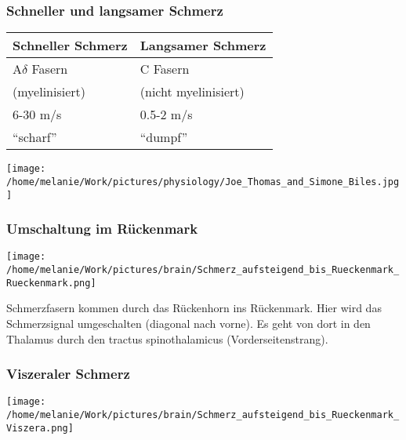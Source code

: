 \documentclass{beamer}
\begin{document}
\begin{frame}
\frametitle{Schneller und langsamer Schmerz}

\begin{center}

\begin{tabular}{|l|l|}
\hline
Schneller Schmerz       & Langsamer Schmerz \\
\hline
A\(\delta\) Fasern     & C Fasern \\
(myelinisiert)          & (nicht myelinisiert) \\
6-30 m/s                & 0.5-2 m/s \\
``scharf''              & ``dumpf'' \\
\hline
\end{tabular}

\end{center}


\pause
\begin{center}
\texttt{[image: /home/melanie/Work/pictures/physiology/Joe\_Thomas\_and\_Simone\_Biles.jpg]}
\end{center}



\end{frame}









\begin{frame}
\frametitle{Umschaltung im Rückenmark}

\begin{center}
\texttt{[image: /home/melanie/Work/pictures/brain/Schmerz\_aufsteigend\_bis\_Rueckenmark\_Rueckenmark.png]}
\end{center}

\pause

Schmerzfasern kommen durch das Rückenhorn ins Rückenmark. Hier wird das Schmerzsignal umgeschalten (diagonal nach vorne). Es geht von dort in den Thalamus durch den tractus spinothalamicus (Vorderseitenstrang). 

\end{frame}


\begin{frame}

\frametitle{Viszeraler Schmerz}

 \begin{center}
\texttt{[image: /home/melanie/Work/pictures/brain/Schmerz\_aufsteigend\_bis\_Rueckenmark\_Viszera.png]}
\end{center}


\end{frame}
\end{document}
